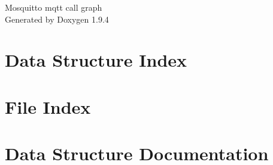 \documentclass[twoside]{book}
\newcommand{\+}{\discretionary{\mbox{\scriptsize$\hookleftarrow$}}{}{}}
\newcommand{\clearemptydoublepage}{%
    \newpage{\pagestyle{empty}\cleardoublepage}%
  }
\begin{document}
  \raggedbottom
    \hypersetup{pageanchor=false,
                bookmarksnumbered=true,
                pdfencoding=unicode
               }
  \begin{titlepage}
  \vspace*{7cm}
  \begin{center}%
  {\Large Mosquitto mqtt call graph}\\
  \vspace*{1cm}
  {\large Generated by Doxygen 1.9.4}\\
  \end{center}
  \end{titlepage}
  \clearemptydoublepage
  \tableofcontents
  \clearemptydoublepage
  \hypersetup{pageanchor=true}
\chapter{Data Structure Index}

\chapter{File Index}

\chapter{Data Structure Documentation}









































\end{document}
